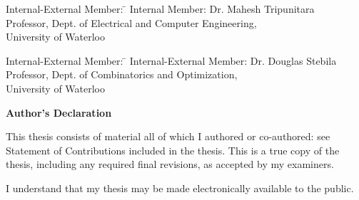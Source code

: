   \noindent
  \begin{tabbing}
Internal-External Member: \=  \kill %
Internal Member: \>  Dr. Mahesh Tripunitara  \\
\> Professor, Dept. of Electrical and Computer Engineering,\\
\> University of Waterloo \\
\end{tabbing}
  \bigskip

  
  \noindent
\begin{tabbing}
Internal-External Member: \=  \kill %
Internal-External Member: \>  Dr. Douglas Stebila  \\
\> Professor, Dept. of Combinatorics and Optimization,\\ \> University of Waterloo \\
\end{tabbing}
  \bigskip
  

\cleardoublepage
{}    %

 \begin{center}\textbf{Author's Declaration}\end{center}

 \noindent
 \noindent  
This thesis consists of material all of which I authored or co-authored: see Statement of Contributions included in the thesis. This is a true copy of the thesis, including any required final revisions, as accepted by my examiners.
  \bigskip
  
  \noindent
I understand that my thesis may be made electronically available to the public.

